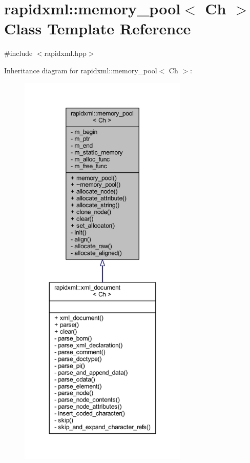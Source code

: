 \hypertarget{classrapidxml_1_1memory__pool}{\section{rapidxml\+:\+:memory\+\_\+pool$<$ Ch $>$ Class Template Reference}
\label{classrapidxml_1_1memory__pool}
}


{\ttfamily \#include $<$rapidxml.\+hpp$>$}



Inheritance diagram for rapidxml\+:\+:memory\+\_\+pool$<$ Ch $>$\+:
\nopagebreak
\begin{figure}[H]
\begin{center}
\leavevmode
\includegraphics[height=550pt]{classrapidxml_1_1memory__pool__inherit__graph}
\end{center}
\end{figure}


